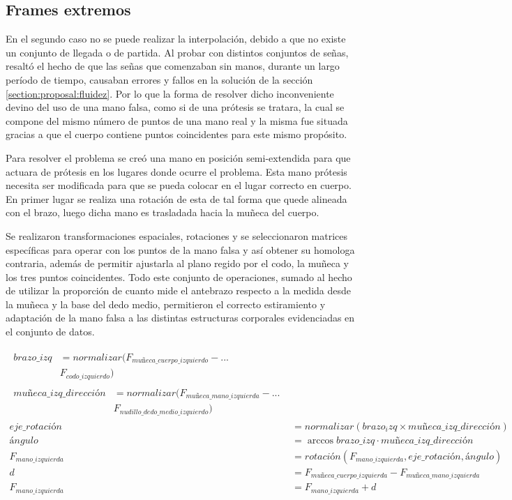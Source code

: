 \subsection{Frames extremos}
En el segundo caso no se puede realizar la interpolación, debido a que no existe un conjunto de llegada o de partida. Al probar con distintos conjuntos de señas, resaltó el hecho de que las señas que comenzaban sin manos, durante un largo período de tiempo, causaban errores y fallos en la solución de la sección \ref{section:proposal:fluidez}.  Por lo que la forma de resolver dicho inconveniente devino del uso de una mano falsa, como si de una prótesis se tratara, la cual se compone del mismo número de puntos de una mano real y la misma fue situada gracias a que el cuerpo contiene puntos coincidentes para este mismo propósito.

Para resolver el problema se creó una mano en posición semi-extendida para que actuara de prótesis en los lugares 
donde ocurre el problema. Esta mano prótesis necesita ser modificada para que se pueda colocar en el lugar correcto 
en cuerpo. En primer lugar se realiza una rotación de esta de tal forma que quede alineada con el brazo, luego dicha 
mano es trasladada hacia la muñeca del cuerpo.

Se realizaron transformaciones espaciales, rotaciones y se seleccionaron matrices específicas para operar con los puntos de la mano falsa y así obtener su homologa contraria, además de permitir ajustarla al plano regido por el codo, la muñeca y los tres puntos coincidentes. Todo este conjunto de operaciones, sumado al hecho de utilizar la proporción de cuanto mide el antebrazo respecto a la medida desde la muñeca y la base del dedo medio, permitieron el correcto estiramiento y adaptación de la mano falsa a las distintas estructuras corporales evidenciadas en el conjunto de datos.

\begin{align}
\begin{split}
brazo\_izq &= normalizar(F_{muñeca\_cuerpo\_izquierdo} - ... \\
& F_{codo\_izquierdo})
\end{split}\\
\begin{split}
muñeca\_izq\_dirección &= normalizar(F_{muñeca\_mano\_izquierda} - ... \\
& F_{nudillo\_dedo\_medio\_izquierdo})
\end{split}\\
eje\_rotación &= normalizar(brazo_izq \times muñeca\_izq\_dirección) \\
ángulo &= \arccos brazo\_izq \cdot muñeca\_izq\_dirección \\
F_{mano\_izquierda} &= rotación(F_{mano\_izquierda}, eje\_rotación, ángulo) \\
d &= F_{muñeca\_cuerpo\_izquierda} - F_{muñeca\_mano\_izquierda} \\
F_{mano\_izquierda} &= F_{mano\_izquierda} + d
\end{align}

